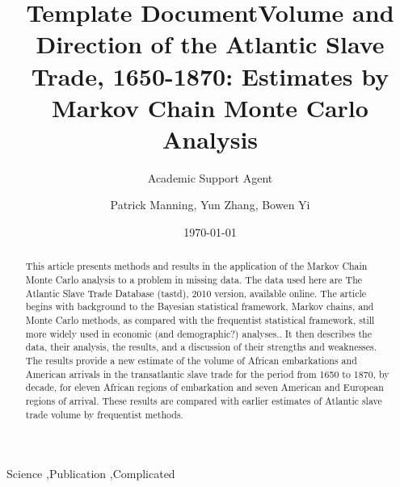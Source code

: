 \documentclass{article}
\title{Template Document}
\author{Academic Support Agent}
\date{\today}
\begin{document}
\maketitle

\begin{frontmatter}


\title{Volume and Direction of the Atlantic Slave Trade, 1650-1870:
Estimates by Markov Chain Monte Carlo Analysis
}




\author{Patrick Manning, Yun Zhang, Bowen Yi}

\address{}

\begin{abstract}
This article presents methods and results in the application of the Markov Chain Monte Carlo analysis to a problem in missing data. The data used here are The Atlantic Slave Trade Database (tastd), 2010 version, available online.  The article begins with background to the Bayesian statistical framework, Markov chains, and Monte Carlo methods, as compared with the frequentist statistical framework, still more widely used in economic (and demographic?) analyses.. It then describes the data, their analysis, the results, and a discussion of their strengths and weaknesses. The results provide a new estimate of the volume of African embarkations and American arrivals in the transatlantic slave trade for the period from 1650 to 1870, by decade, for eleven African regions of embarkation and seven  American and European regions of arrival. These results are compared with earlier estimates of Atlantic slave trade volume by frequentist methods. 
\end{abstract}

\begin{keyword}
Science \sep Publication \sep Complicated


\end{keyword}

\end{frontmatter}
\end{document}
